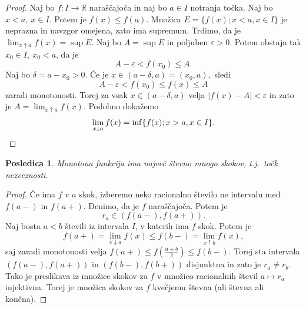 \documentclass[10pt, a4paper]{article}
\newtheorem{posledica}[izr]{Posledica}
\newenvironment{noticeC}{%
  \tcolorbox[%
  notitle,
  empty,
  enhanced,  %
  breakable,
  coltext=black, 
  fontupper=\rmfamily,
  noparskip,
  sharp corners,
  boxrule=-1pt,  %
  frame hidden,
  left=7pt,  %
  right=7pt,
  top=5pt,
  bottom=5pt,
  before skip=2.5ex plus 2pt,
  after skip=2.5ex plus 2pt,
  overlay unbroken and last={%
  },
  ]}
{\endtcolorbox}
\newenvironment{dokaz}%
  {\begin{noticeC}\begin{proof}}%
  {\end{proof}\end{noticeC}}
\newcommand{\R}{\mathbb {R}}
\newcommand{\rlimf}[3]{\lim_{#1 \downarrow #2} {#3}}
\newcommand{\llimf}[3]{\lim_{#1 \uparrow #2} {#3}}
\begin{document}
\begin{dokaz}
    Naj bo $f: I \rightarrow \R$ naraščajoča in naj bo $a \in I$ notranja točka. Naj bo $x < a,\ x \in I$. Potem je $f(x) \leq f(a).$ Množica $E = \{f(x); x<a, x \in I\}$ je neprazna in navzgor omejena, zato ima supremum. 
    Trdimo, da je $\llimf{x}{a}{f(x)} = \sup E.$ Naj bo $A = \sup E$ in poljuben $\varepsilon >0$. Potem obstaja tak $x_0 \in I,\ x_0 < a$, da je $$A - \varepsilon < f(x_0) \leq A.$$ Naj bo $\delta = a - x_0 > 0$.
    Če je $x \in (a - \delta, a) = (x_0, a),$ sledi $$A - \varepsilon < f(x_0) \leq f(x) \leq A$$ zaradi monotonosti. Torej za vsak $x \in (a - \delta, a)$ velja $|f(x) - A| < \varepsilon$ in
    zato je $A = \llimf{x}{a}{f(x)}.$ Podobno dokažemo 
    \begin{equation*}
        \rlimf{x}{a}{f(x)} = \inf \{f(x); x>a, x \in I\}. \qedhere
    \end{equation*}
\end{dokaz}

\begin{posledica}
    Monotona funkcija ima največ števno mnogo skokov, t.j.~točk nezveznosti.
\end{posledica}

\begin{dokaz}
    Če ima $f$ v $a$ skok, izberemo neko racionalno število ne intervalu med $f(a-)$ in $f(a+)$. Denimo, da je $f$ naraščajoča. Potem je $$r_a \in (f(a-), f(a+)).$$ Naj bosta $a<b$ števili iz intervala $I$, v katerih ima $f$ skok. 
    Potem je $$f(a+) = \rlimf{x}{a}{f(x)} \leq f(b-) = \llimf{x}{b}{f(x)},$$ saj zaradi monotonosti velja $f(a+) \leq f\left(\frac{a+b}{2}\right) \leq f(b-).$ 
    Torej sta intervala $(f(a-),f(a+))$ in $(f(b-), f(b+))$ disjunktna in zato je $r_a \neq r_b.$
    Tako je preslikava iz množice skokov za $f$ v množico racionalnih števil $a \mapsto r_a$ injektivna. Torej je množica skokov za $f$ kvečjemu števna (ali števna ali končna).
\end{dokaz}
\end{document}
